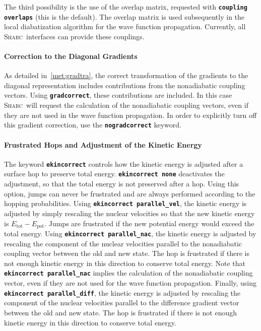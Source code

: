 \documentclass[a4paper,10pt,DIV=15,openany]{scrbook}
\newcommand{\sharc}{\textsc{Sharc}}
\newcommand{\ttt}[1]{\textbf{\texttt{#1}}}
\begin{document}
The third possibility is the use of the overlap matrix, requested with \ttt{coupling overlaps} (this is the default). The overlap matrix is used subsequently in the local diabatization algorithm for the wave function propagation. Currently, all \sharc\ interfaces can provide these couplings.

\paragraph{Correction to the Diagonal Gradients}

As detailed in~\ref{met:gradtra}, the correct transformation of the gradients to the diagonal representation includes contributions from the nonadiabatic coupling vectors. Using \ttt{gradcorrect}, these contributions are included. In this case \sharc\ will request the calculation of the nonadiabatic coupling vectors, even if they are not used in the wave function propagation. In order to explicitly turn off this gradient correction, use the \ttt{nogradcorrect} keyword.

\paragraph{Frustrated Hops and Adjustment of the Kinetic Energy}

The keyword \ttt{ekincorrect} controls how the kinetic energy is adjusted after a surface hop to preserve total energy. \ttt{ekincorrect none} deactivates the adjustment, so that the total energy is not preserved after a hop. Using this option, jumps can never be frustrated and are always performed according to the hopping probabilities. 
Using \ttt{ekincorrect parallel\_vel}, the kinetic energy is adjusted by simply rescaling the nuclear velocities so that the new kinetic energy is $E_{\text{tot}}-E_{\text{pot}}$. Jumps are frustrated if the new potential energy would exceed the total energy.
Using \ttt{ekincorrect parallel\_nac}, the kinetic energy is adjusted by rescaling the component of the nuclear velocities parallel to the nonadiabatic coupling vector between the old and new state. The hop is frustrated if there is not enough kinetic energy in this direction to conserve total energy. Note that \ttt{ekincorrect parallel\_nac} implies the calculation of the nonadiabatic coupling vector, even if they are not used for the wave function propagation.
Finally, using \ttt{ekincorrect parallel\_diff}, the kinetic energy is adjusted by rescaling the component of the nuclear velocities parallel to the difference gradient vector between the old and new state. The hop is frustrated if there is not enough kinetic energy in this direction to conserve total energy. 
\end{document}
